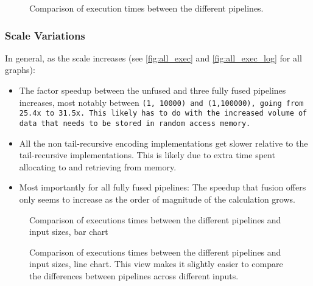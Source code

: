 \begin{figure}[h]
    
    \caption{Comparison of execution times between the different pipelines.}
    \label{fig:res_1000}
\end{figure}

\subsubsection{Scale Variations}\label{sec:scale_var}
In general, as the scale increases (see \autoref{fig:all_exec} and \autoref{fig:all_exec_log} for all graphs):
\begin{itemize}[noitemsep]
    \item The factor speedup between the unfused and three fully fused pipelines increases, most notably between \tt{(1, 10000)} and \tt{(1,100000)}, going from 25.4x to 31.5x.
    This likely has to do with the increased volume of data that needs to be stored in random access memory.
    \item All the non tail-recursive encoding implementations get slower relative to the tail-recursive implementations.
    This is likely due to extra time spent allocating to and retrieving from memory.
    \item Most importantly for all fully fused pipelines: The speedup that fusion offers only seems to increase as the order of magnitude of the calculation grows.
\end{itemize}

\begin{figure}[H]
    \centering
    
    \caption{Comparison of executions times between the different pipelines and input sizes, bar chart}
    \label{fig:results1}
\end{figure}
\begin{figure}[H]
    \centering
    
    \caption{Comparison of executions times between the different pipelines and input sizes, line chart. This view makes it slightly easier to compare the differences between pipelines across different inputs.}
    \label{fig:results2}
\end{figure}
